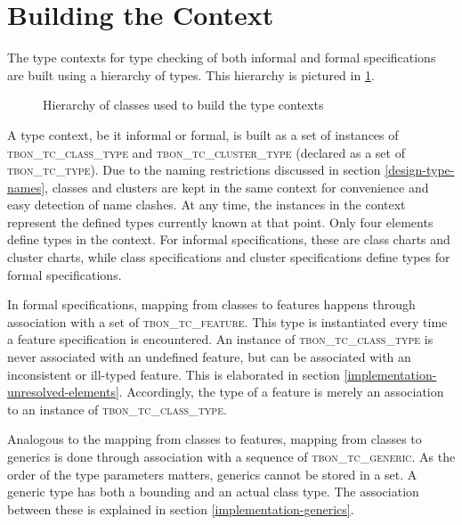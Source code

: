 \section{Building the Context}
\label{implementation-context-class-structure}
The type contexts for type checking of both informal and formal specifications are built using a hierarchy of types. This hierarchy is pictured in \ref{fig:context-classes}.
\begin{figure}[H]
    \centerline{}
    \caption[Context classes]{Hierarchy of classes used to build the type contexts}
    \label{fig:context-classes}
\end{figure}
A type context, be it informal or formal, is built as a set of instances of \textsc{tbon\_tc\_class\_type}  and \textsc{tbon\_tc\_cluster\_type}  (declared as a set of \textsc{tbon\_tc\_type}). Due to the naming restrictions discussed in section \ref{design-type-names}, classes and clusters are kept in the same context for convenience and easy detection of name clashes. At any time, the instances in the context represent the defined types currently known at that point. Only four \bon{} elements define types in the context. For informal specifications, these are class charts and cluster charts, while class specifications and cluster specifications define types for formal specifications.

In formal specifications, mapping from classes to features happens through association with a set of \textsc{tbon\_tc\_feature}. This type is instantiated every time a feature specification is encountered. An instance of \textsc{tbon\_tc\_class\_type} is never associated with an undefined feature, but can be associated with an inconsistent or ill-typed feature. This is elaborated in section \ref{implementation-unresolved-elements}. Accordingly, the type of a feature is merely an association to an instance of \textsc{tbon\_tc\_class\_type}.

Analogous to the mapping from classes to features, mapping from classes to generics is done through association with a sequence of \textsc{tbon\_tc\_generic}. As the order of the type parameters matters, generics cannot be stored in a set. A generic type has both a bounding and an actual class type. The association between these is explained in section \ref{implementation-generics}.

